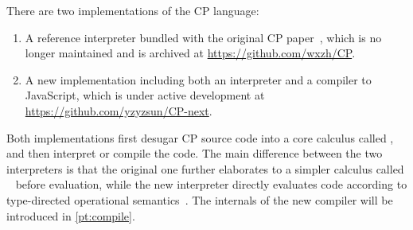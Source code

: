 There are two implementations of the CP language:
\begin{enumerate}
\item A reference interpreter bundled with the original CP
      paper~\citep{zhang2021compositional}, which is no longer maintained and is
      archived at \url{https://github.com/wxzh/CP}.
\item A new implementation including both an interpreter and a compiler to
      JavaScript, which is under active development at
      \url{https://github.com/yzyzsun/CP-next}.
\end{enumerate}
Both implementations first desugar CP source code into a core calculus called
\fiplus, and then interpret or compile the \fiplus code. The main difference
between the two interpreters is that the original one further elaborates \fiplus
to a simpler calculus called \fco~\citep{bi2019distributive} before evaluation,
while the new interpreter directly evaluates \fiplus code according to
type-directed operational semantics~\citep{huang2021taming,fan2022direct}. The
internals of the new compiler will be introduced in \autoref{pt:compile}.
